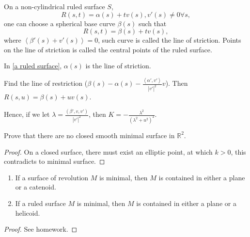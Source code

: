 \begin{remark}
    On a non-cylindrical ruled surface \(S\), \ie\ 
    \[R(s,t)=\alpha(s)+t v(s),v'(s)\neq 0\forall s,\]
    one can choose a spherical base curve \(\beta(s)\) such
    that 
    \[
        R(s,t)=\beta(s)+t v(s),    
    \]
    where \(\left\langle\beta'(s)+v'(s)\right\rangle=0\),
     such curve is called the line of striction. Points on the line
      of striction is called the central points of the ruled surface.
\end{remark}
\begin{example}
    In \cref{a ruled surface}, \(\alpha(s)\) is the line of striction.
\end{example}
\begin{exercise}
    Find the line of restriction (\(\beta(s)-\alpha(s)
    -\frac{\left\langle\alpha',v'\right\rangle}{|v'|^2}v\)).
    Then \(R(s,u)=\beta(s)+u v(s)\).

    Hence, if we let \(\lambda=\frac{(\beta',v,v')}{|v'|^2}\), then 
    \(K=-\frac{\lambda^2}{\left(\lambda^2+u^2\right)^2}\).
\end{exercise}
\begin{exercise}[Homework]
    Prove that there are no closed smooth minimal surface in 
    \(\mathbb{R}^2\).
\end{exercise}
\begin{proof}
    On a closed surface, there must exist an elliptic point, at which 
    \(k>0\), this contradicts to minimal surface.
\end{proof}
\begin{theorem}
    \begin{enumerate}[(1)]
        \item If a surface of revolution \(M\) is minimal, then 
        \(M\) is contained in either a plane or a catenoid.
        \item If a ruled surface \(M\) is minimal, then \(M\) is 
        contained in either a plane or a helicoid.
    \end{enumerate}
\end{theorem}
\begin{proof}
    See homework.
\end{proof}
